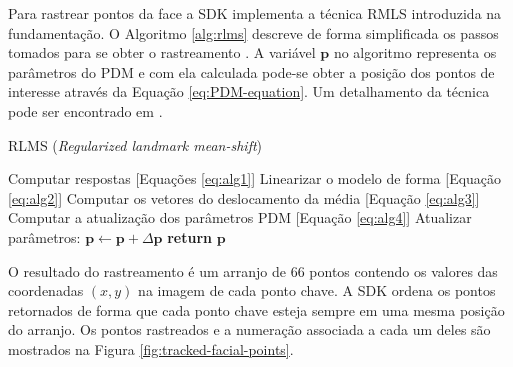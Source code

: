 Para rastrear pontos da face a SDK implementa a técnica RMLS introduzida na
fundamentação. O Algoritmo \ref{alg:rlms} descreve de forma simplificada os
passos tomados para se obter o rastreamento \cite{saragih2011deformable}. A
variável $\mathbf{p}$ no algoritmo representa os parâmetros do PDM e com ela
calculada pode-se obter a posição dos pontos de interesse através da Equação
\ref{eq:PDM-equation}. Um detalhamento da técnica pode ser encontrado em
\cite{saragih2011deformable}.

\begin{algorithm}[!htb]
\caption{RLMS (\textit{Regularized landmark mean-shift})}\label{alg:rlms}
\begin{algorithmic}[1]
 
\State Computar respostas [Equações \ref{eq:alg1}]
   \State Linearizar o modelo de forma [Equação \ref{eq:alg2}]
   \State Computar os vetores do deslocamento da média [Equação \ref{eq:alg3}]
   \State Computar a atualização dos parâmetros PDM [Equação \ref{eq:alg4}]
   \State Atualizar parâmetros: $\textbf{p} \leftarrow \textbf{p} + \Delta\textbf{p}$
   \EndWhile
   \State \textbf{return} $\textbf{p}$
\end{algorithmic}
\end{algorithm}





O resultado do rastreamento é um arranjo de 66 pontos contendo os valores das
coordenadas $(x,y)$ na imagem de cada ponto chave. A SDK ordena os pontos
retornados de forma que cada ponto chave esteja sempre em uma mesma posição do
arranjo. Os pontos rastreados e a numeração associada a cada um deles são
mostrados na  Figura \ref{fig:tracked-facial-points}. 

